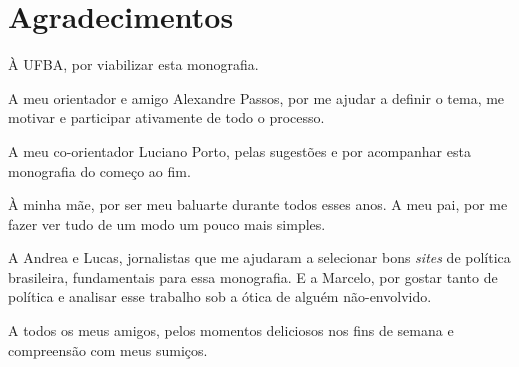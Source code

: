 \chapter*{Agradecimentos}

À UFBA, por viabilizar esta monografia.

A meu orientador e amigo Alexandre Passos, por me ajudar a definir o tema, me motivar e participar ativamente de todo o processo.

A meu co-orientador Luciano Porto, pelas sugestões e por acompanhar esta monografia do começo ao fim.

À minha mãe, por ser meu baluarte durante todos esses anos. A meu pai, por me fazer ver tudo de um modo um pouco mais simples.

A Andrea e Lucas, jornalistas que me ajudaram a selecionar bons \emph{sites} de política brasileira, fundamentais para essa monografia. E a Marcelo, por gostar tanto de política e analisar esse trabalho sob a ótica de alguém não-envolvido.

A todos os meus amigos, pelos momentos deliciosos nos fins de semana e compreensão com meus sumiços.

